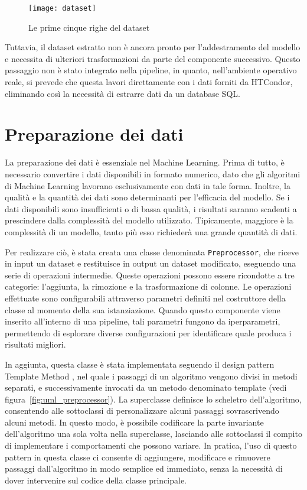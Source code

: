 \begin{figure}[!ht]
    \centering
    \texttt{[image: dataset]}
    \caption{Le prime cinque righe del dataset}
    \label{fig:dataset_from_join_hj_htjob}
\end{figure}

Tuttavia, il dataset estratto non è ancora pronto per l'addestramento del
modello e necessita di ulteriori trasformazioni da parte del componente
successivo. Questo passaggio non è stato integrato nella pipeline, in quanto,
nell'ambiente operativo reale, si prevede che questa lavori direttamente con i
dati forniti da HTCondor, eliminando così la necessità di estrarre dati da un
database SQL.

\section{Preparazione dei dati}
\label{sec:preprocessing}

La preparazione dei dati è essenziale nel Machine Learning. Prima di tutto, è
necessario convertire i dati disponibili in formato numerico, dato che gli
algoritmi di Machine Learning lavorano esclusivamente con dati in tale forma.
Inoltre, la qualità e la quantità dei dati sono determinanti per l'efficacia
del modello. Se i dati disponibili sono insufficienti o di bassa qualità, i
risultati saranno scadenti a prescindere dalla complessità del modello
utilizzato. Tipicamente, maggiore è la complessità di un modello, tanto più
esso richiederà una grande quantità di dati.

Per realizzare ciò, è stata creata una classe denominata
\texttt{Preprocessor}, che riceve in input un dataset e restituisce in output
un dataset modificato, eseguendo una serie di operazioni intermedie. Queste
operazioni possono essere ricondotte a tre categorie: l'aggiunta, la rimozione
e la trasformazione di colonne. Le operazioni effettuate sono configurabili
attraverso parametri definiti nel costruttore della classe al momento della
sua istanziazione. Quando questo componente viene inserito all'interno di una
pipeline, tali parametri fungono da iperparametri, permettendo di esplorare
diverse configurazioni per identificare quale produca i risultati migliori.

In aggiunta, questa classe è stata implementata seguendo il design pattern
Template Method \cite{gamma1994}, nel quale i passaggi di un algoritmo vengono
divisi in metodi separati, e successivamente invocati da un metodo denominato
template (vedi figura~\ref{fig:uml_preprocessor}). La superclasse definisce lo
scheletro dell'algoritmo, consentendo alle sottoclassi di personalizzare
alcuni passaggi sovrascrivendo alcuni metodi. In questo modo, è possibile
codificare la parte invariante dell'algoritmo una sola volta nella
superclasse, lasciando alle sottoclassi il compito di implementare i
comportamenti che possono variare. In pratica, l'uso di questo pattern in
questa classe ci consente di aggiungere, modificare e rimuovere passaggi
dall'algoritmo in modo semplice ed immediato, senza la necessità di dover
intervenire sul codice della classe principale.


